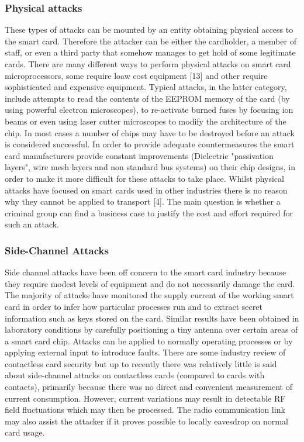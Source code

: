 \documentclass[12pt]{article}
\begin{document}
\subsubsection{Physical attacks}
These types of attacks can be mounted by an entity
obtaining physical access to the smart card. Therefore
the attacker can be either the cardholder, a member of
staff, or even a third party that somehow manages to
get hold of some legitimate cards. \newline
There are many different ways to perform physical
attacks on smart card microprocessors, some require
loaw cost equipment [13] and other require
sophisticated and expensive equipment. Typical
attacks, in the latter category, include attempts to read
the contents of the EEPROM memory of the card (by
using powerful electron microscopes), to re-activate
burned fuses by focusing ion beams or even using laser
cutter microscopes to modify the architecture of the
chip. In most cases a number of chips may have to be
destroyed before an attack is considered successful. In
order to provide adequate countermeasures the smart
card manufacturers provide constant improvements
(Dielectric "passivation layers", wire mesh layers and
non standard bus systems) on their chip designs, in
order to make it more difficult for these attacks to take
place. \newline
Whilst physical attacks have focused on smart cards
used in other industries there is no reason why they
cannot be applied to transport [4]. The main question is
whether a criminal group can find a business case to
justify the cost and effort required for such an attack.




\subsubsection{Side-Channel Attacks}
Side channel attacks have been off concern to the
smart card industry because they require modest levels
of equipment and do not necessarily damage the card.
The majority of attacks have monitored the supply
current of the working smart card in order to infer how
particular processes run and to extract secret
information such as keys stored on the card. Similar
results have been obtained in laboratory conditions by
carefully positioning a tiny antenna over certain areas
of a smart card chip. Attacks can be applied to
normally operating processes or by applying external
input to introduce faults. \newline
There are some industry review of contactless card
security  but up to recently there was relatively
little is said about side-channel attacks on contactless
cards (compared to cards with contacts), primarily
because there was no direct and convenient
measurement of current consumption. However,
current variations may result in detectable RF field
fluctuations which may then be processed. The radio
communication link may also assist the attacker if it
proves possible to locally eavesdrop on normal card
usage.
\end{document}
